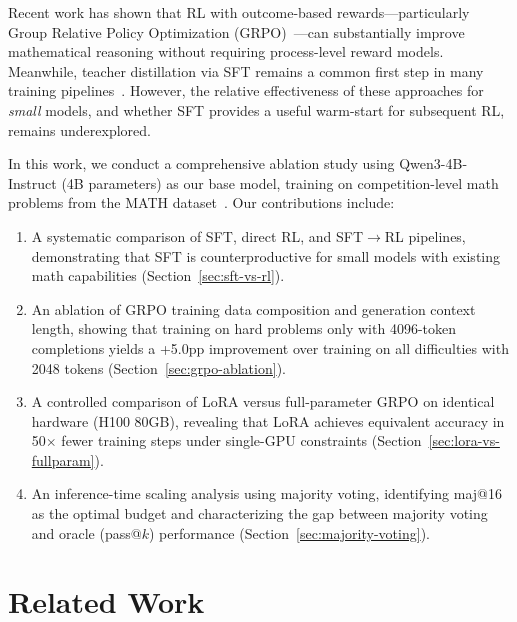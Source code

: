 \documentclass[11pt,a4paper]{article}
\newcommand{\modelname}{Qwen3-4B-Instruct}
\begin{document}
Recent work has shown that RL with outcome-based rewards---particularly Group Relative Policy Optimization (GRPO)~\citep{shao2024deepseekmath}---can substantially improve mathematical reasoning without requiring process-level reward models. Meanwhile, teacher distillation via SFT remains a common first step in many training pipelines~\citep{mukherjee2023orca, yu2024metamath}. However, the relative effectiveness of these approaches for \emph{small} models, and whether SFT provides a useful warm-start for subsequent RL, remains underexplored.

In this work, we conduct a comprehensive ablation study using \modelname{} (4B parameters) as our base model, training on competition-level math problems from the MATH dataset~\citep{hendrycks2021measuring}. Our contributions include:

\begin{enumerate}[leftmargin=*]
    \item A systematic comparison of SFT, direct RL, and SFT$\rightarrow$RL pipelines, demonstrating that SFT is counterproductive for small models with existing math capabilities (Section~\ref{sec:sft-vs-rl}).

    \item An ablation of GRPO training data composition and generation context length, showing that training on hard problems only with 4096-token completions yields a +5.0pp improvement over training on all difficulties with 2048 tokens (Section~\ref{sec:grpo-ablation}).

    \item A controlled comparison of LoRA versus full-parameter GRPO on identical hardware (H100 80GB), revealing that LoRA achieves equivalent accuracy in 50$\times$ fewer training steps under single-GPU constraints (Section~\ref{sec:lora-vs-fullparam}).

    \item An inference-time scaling analysis using majority voting, identifying maj@16 as the optimal budget and characterizing the gap between majority voting and oracle (pass@$k$) performance (Section~\ref{sec:majority-voting}).
\end{enumerate}

\section{Related Work}
\end{document}
